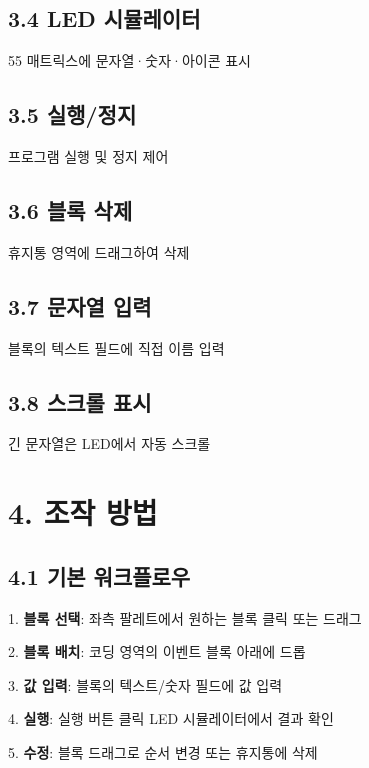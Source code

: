 \documentclass[11pt,a4paper]{article}
\begin{document}
\subsection*{3.4 LED 시뮬레이터}

5\texttimes{}5 매트릭스에 문자열·숫자·아이콘 표시


\subsection*{3.5 실행/정지}

프로그램 실행 및 정지 제어


\subsection*{3.6 블록 삭제}

휴지통 영역에 드래그하여 삭제


\subsection*{3.7 문자열 입력}

블록의 텍스트 필드에 직접 이름 입력


\subsection*{3.8 스크롤 표시}

긴 문자열은 LED에서 자동 스크롤



\section*{4. 조작 방법}

\subsection*{4.1 기본 워크플로우}

1. \textbf{블록 선택}: 좌측 팔레트에서 원하는 블록 클릭 또는 드래그

2. \textbf{블록 배치}: 코딩 영역의 이벤트 블록 아래에 드롭

3. \textbf{값 입력}: 블록의 텍스트/숫자 필드에 값 입력

4. \textbf{실행}:  실행 버튼 클릭 \textrightarrow{} LED 시뮬레이터에서 결과 확인

5. \textbf{수정}: 블록 드래그로 순서 변경 또는 휴지통에 삭제
\end{document}
